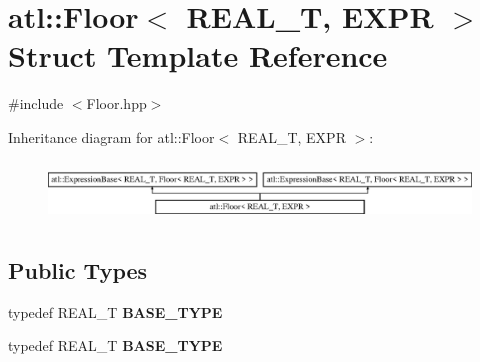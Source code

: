 \hypertarget{structatl_1_1_floor}{\section{atl\+:\+:Floor$<$ R\+E\+A\+L\+\_\+\+T, E\+X\+P\+R $>$ Struct Template Reference}
\label{structatl_1_1_floor}
}


{\ttfamily \#include $<$Floor.\+hpp$>$}

Inheritance diagram for atl\+:\+:Floor$<$ R\+E\+A\+L\+\_\+\+T, E\+X\+P\+R $>$\+:\begin{figure}[H]
\begin{center}
\leavevmode
\includegraphics[height=1.600000cm]{structatl_1_1_floor}
\end{center}
\end{figure}
\subsection*{Public Types}
\begin{DoxyCompactItemize}
\item 
\hypertarget{structatl_1_1_floor_a993fa1a6710cdba80b7b63774f837452}{typedef R\+E\+A\+L\+\_\+\+T {\bfseries B\+A\+S\+E\+\_\+\+T\+Y\+P\+E}}\label{structatl_1_1_floor_a993fa1a6710cdba80b7b63774f837452}

\item 
\hypertarget{structatl_1_1_floor_a993fa1a6710cdba80b7b63774f837452}{typedef R\+E\+A\+L\+\_\+\+T {\bfseries B\+A\+S\+E\+\_\+\+T\+Y\+P\+E}}\label{structatl_1_1_floor_a993fa1a6710cdba80b7b63774f837452}

\end{DoxyCompactItemize}
